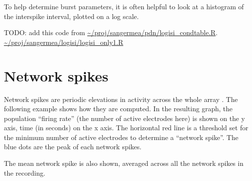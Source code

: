 \documentclass{article}\usepackage[]{graphicx}\usepackage[]{color}
\begin{document}
To help determine burst parameters, it is often helpful to look at a
histogram of the interspike interval, plotted on a log scale.  

TODO: add this code from
\url{~/proj/sangermea/pdn/logisi_condtable.R}.
\url{~/proj/sangermea/logisi/logisi_only1.R}

\section*{Network spikes}

Network spikes are periodic elevations in activity across the whole
array \citep{Eytan2006}.  The following example shows how they are computed.
In the resulting graph, the population ``firing rate'' (the number of
active electrodes here) is shown on the y axis, time (in seconds) on
the x axis.  The horizontal red line is a threshold set for the
minimum number of active electrodes to determine a ``network spike''.
The blue dots are the peak of each network spikes.

The mean network spike is also shown, averaged across all the network
spikes in the recording.
\end{document}
